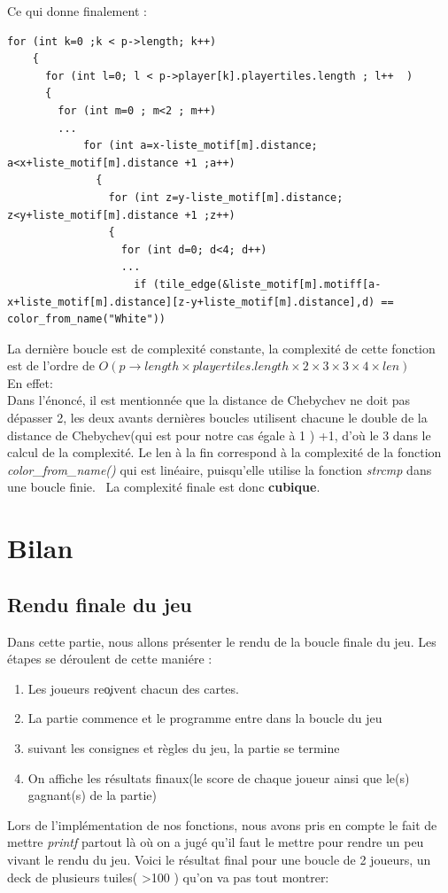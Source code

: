 \documentclass[12pt,a4paper]{extarticle}
\begin{document}
    Ce qui donne finalement : 
    \begin{lstlisting}[style=CStyle]
for (int k=0 ;k < p->length; k++)
    {
      for (int l=0; l < p->player[k].playertiles.length ; l++  )
      {
        for (int m=0 ; m<2 ; m++)
        ...
            for (int a=x-liste_motif[m].distance; a<x+liste_motif[m].distance +1 ;a++)
              {
                for (int z=y-liste_motif[m].distance; z<y+liste_motif[m].distance +1 ;z++)
                {
                  for (int d=0; d<4; d++)
                  ...
                    if (tile_edge(&liste_motif[m].motiff[a-x+liste_motif[m].distance][z-y+liste_motif[m].distance],d) == color_from_name("White")) \end{lstlisting}
    La derni\`ere boucle est de complexit\'e constante, la complexit\'e de cette fonction est de l'ordre de \( O(p \rightarrow length \times playertiles.length \times 2 \times 3 \times 3 \times 4 \times len)  \)
    \\En effet: \\
    Dans l'\'enonc\'e, il est mentionn\'ee que la distance de Chebychev ne doit pas d\'epasser 2, les deux avants derni\`eres boucles utilisent chacune le double de la distance
    de Chebychev(qui est pour notre cas \'egale \`a 1 ) +1, d'o\`u le 3 dans le calcul de la complexit\'e. Le len \`a la fin correspond \`a la complexit\'e de la fonction \emph{color\_from\_name()} qui est 
    lin\'eaire, puisqu'elle utilise la fonction \emph{strcmp} dans une boucle finie.  \
    La complexit\'e finale est donc \textbf{cubique}.

    \section{Bilan}
    \subsection{Rendu finale du jeu}
    Dans cette partie, nous allons pr\'esenter le rendu de la boucle finale du jeu.
    Les \'etapes se d\'eroulent de cette mani\'ere : 
    \begin{enumerate}
        \item Les joueurs re\c oivent chacun des cartes.
        \item La partie commence et le programme entre dans la boucle du jeu
        \item suivant les consignes et r\`egles du jeu, la partie se termine
        \item On affiche les r\'esultats finaux(le score de chaque joueur ainsi que le(s) gagnant(s) de la partie)
    \end{enumerate}
    Lors de l'impl\'ementation de nos fonctions, nous avons pris en compte le fait de mettre \emph{printf} partout l\`a o\`u on a jug\'e qu'il faut le mettre
    pour rendre un peu vivant le rendu du jeu.
    Voici le r\'esultat final pour une boucle de 2 joueurs, un deck de plusieurs tuiles( >100 ) qu'on va pas tout montrer:
\end{document}
